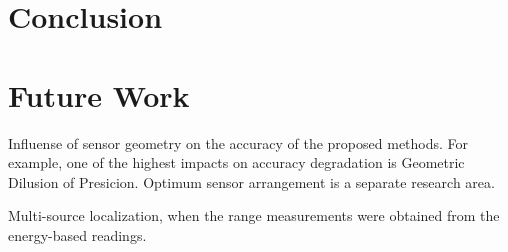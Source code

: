 
\section{Conclusion}


\section{Future Work}

Influense of sensor geometry on the accuracy of the proposed methods. For example, one of the highest impacts on accuracy degradation is Geometric Dilusion of Presicion. Optimum sensor arrangement is a separate research area. 

Multi-source localization, when the range measurements were obtained from the energy-based readings. 